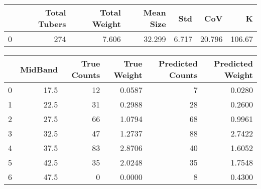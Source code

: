\begin{tabular}{lrrrrrr}
\toprule
{} &  Total Tubers &  Total Weight &  Mean Size &    Std &     CoV &       K \\
\midrule
0 &           274 &         7.606 &     32.299 &  6.717 &  20.796 &  106.67 \\
\bottomrule
\end{tabular}

\begin{tabular}{lrrrrr}
\toprule
{} &  MidBand &  True Counts &  True Weight &  Predicted Counts &  Predicted Weight \\
\midrule
0 &     17.5 &           12 &       0.0587 &                 7 &            0.0280 \\
1 &     22.5 &           31 &       0.2988 &                28 &            0.2600 \\
2 &     27.5 &           66 &       1.0794 &                68 &            0.9961 \\
3 &     32.5 &           47 &       1.2737 &                88 &            2.7422 \\
4 &     37.5 &           83 &       2.8706 &                40 &            1.6052 \\
5 &     42.5 &           35 &       2.0248 &                35 &            1.7548 \\
6 &     47.5 &            0 &       0.0000 &                 8 &            0.4300 \\
\bottomrule
\end{tabular}

